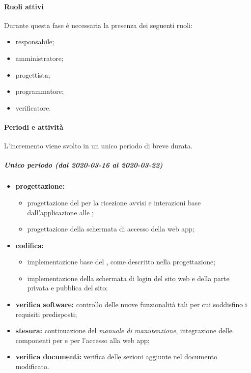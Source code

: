 			\paragraph{Ruoli attivi}
			
				Durante questa fase è necessaria la presenza dei seguenti ruoli:
				\begin{itemize}
					\item responsabile;
					\item amministratore;
					\item progettista;
					\item programmatore;
					\item verificatore.
				\end{itemize}
			
			\paragraph{Periodi e attività}
			
				L'incremento viene svolto in un unico periodo di breve durata.
				
				\subparagraph{Unico periodo (dal 2020-03-16 al 2020-03-22)}
				
					\begin{itemize}
						\item \textbf{progettazione:} 
						\begin{itemize}
							\item progettazione del  per la ricezione avvisi e interazioni base dall'applicazione alle ; 
							\item progettazione della schermata di accesso della web app;
						\end{itemize}
						\item \textbf{codifica:} 
						\begin{itemize}
							\item implementazione base del , come descritto nella progettazione; 
							\item implementazione della schermata di login del sito web e della parte privata e pubblica del sito;
						\end{itemize}
						\item \textbf{verifica software:} controllo delle nuove funzionalità tali per cui soddisfino i requisiti predisposti;
						\item \textbf{stesura:} continuazione del \textit{manuale di manutenzione}, integrazione delle componenti per  e per l'accesso alla web app;
						\item \textbf{verifica documenti:} verifica delle sezioni aggiunte nel documento modificato.
					\end{itemize} 			

